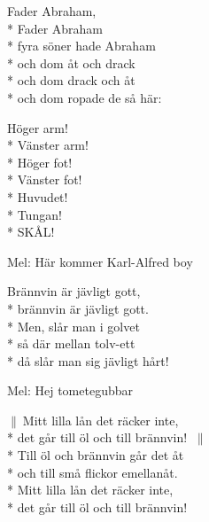 \begin{SongText}
    \begin{SongVerse}
        Fader Abraham,\\*%
        Fader Abraham\\*%
        fyra söner hade Abraham\\*%
        och dom åt och drack\\*%
        och dom drack och åt\\*%
        och dom ropade de så här:
    \end{SongVerse}
    \begin{SongVerse}
        Höger arm!\\*%
        Vänster arm!\\*%
        Höger fot!\\*%
        Vänster fot!\\*%
        Huvudet!\\*%
        Tungan!\\*%
        SKÅL!
    \end{SongVerse}
\end{SongText}
\begin{SongText}
    \begin{SongInfo}
        Mel: Här kommer Karl-Alfred boy
    \end{SongInfo}
    \begin{SongVerse}
        Brännvin är jävligt gott,\\*%
        brännvin är jävligt gott.\\*%
        Men, slår man i golvet\\*%
        så där mellan tolv-ett\\*%
        då slår man sig jävligt hårt!
    \end{SongVerse}
\end{SongText}
\begin{SongText}[Studielånet]
    \begin{SongInfo}
        Mel: Hej tometegubbar
    \end{SongInfo}
    \begin{SongVerse}
        $\|\:$Mitt lilla lån det räcker inte,\\*%
        det går till öl och till brännvin! $\:\|$\\*%
        Till öl och brännvin går det åt\\*%
        och till små flickor emellanåt.\\*%
        Mitt lilla lån det räcker inte,\\*%
        det går till öl och till brännvin!
    \end{SongVerse}
\end{SongText}
